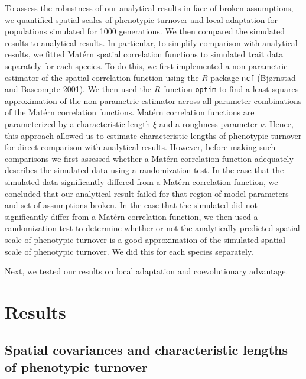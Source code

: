 \documentclass{article}
\begin{document}
To assess the robustness of our analytical results in face of broken
assumptions, we quantified spatial scales of phenotypic turnover and
local adaptation for populations simulated for 1000 generations. We then
compared the simulated results to analytical results. In particular, to
simplify comparison with analytical results, we fitted Matérn spatial
correlation functions to simulated trait data separately for each
species. To do this, we first implemented a non-parametric estimator of
the spatial correlation function using the \emph{R} package \texttt{ncf}
(Bjørnstad and Bascompte 2001). We then used the \emph{R} function
\texttt{optim} to find a least squares approximation of the
non-parametric estimator across all parameter combinations of the Matérn
correlation functions. Matérn correlation functions are parameterized by
a characteristic length \(\xi\) and a roughness parameter \(\nu\).
Hence, this approach allowed us to estimate characteristic lengths of
phenotypic turnover for direct comparison with analytical results.
However, before making such comparisons we first assessed whether a
Matérn correlation function adequately describes the simulated data
using a randomization test. In the case that the simulated data
significantly differed from a Matérn correlation function, we concluded
that our analytical result failed for that region of model parameters
and set of assumptions broken. In the case that the simulated did not
significantly differ from a Matérn correlation function, we then used a
randomization test to determine whether or not the analytically
predicted spatial scale of phenotypic turnover is a good approximation
of the simulated spatial scale of phenotypic turnover. We did this for
each species separately.

Next, we tested our results on local adaptation and coevolutionary
advantage.

\hypertarget{results}{%
\section{Results}\label{results}}

\hypertarget{spatial-covariances-and-characteristic-lengths-of-phenotypic-turnover}{%
\subsection{Spatial covariances and characteristic lengths of phenotypic
turnover}\label{spatial-covariances-and-characteristic-lengths-of-phenotypic-turnover}}
\end{document}
